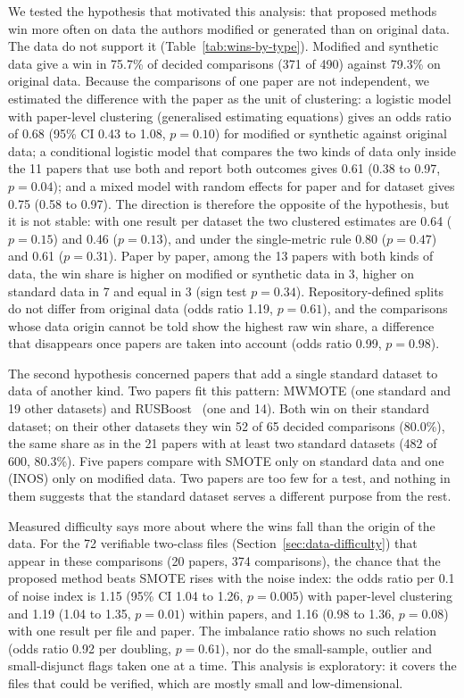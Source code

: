 We tested the hypothesis that motivated this analysis: that proposed methods win
more often on data the authors modified or generated than on original data. The data
do not support it (Table~\ref{tab:wins-by-type}). Modified and synthetic data give a
win in 75.7\% of decided comparisons (371 of 490) against 79.3\% on original data.
Because the comparisons of one paper are not independent, we estimated the
difference with the paper as the unit of clustering: a logistic model with
paper-level clustering (generalised estimating equations) gives an odds ratio of 0.68
(95\% CI 0.43 to 1.08, $p = 0.10$) for modified or synthetic against original data;
a conditional logistic model that compares the two kinds of data only inside the 11
papers that use both and report both outcomes gives 0.61 (0.38 to 0.97, $p = 0.04$);
and a mixed model with random effects for paper and for dataset gives 0.75 (0.58 to
0.97). The direction is therefore the opposite of the hypothesis, but it is not
stable: with one result per dataset the two clustered estimates are 0.64 ($p = 0.15$)
and 0.46 ($p = 0.13$), and under the single-metric rule 0.80 ($p = 0.47$) and 0.61
($p = 0.31$). Paper by paper, among the 13 papers with both kinds of data, the win
share is higher on modified or synthetic data in 3, higher on standard data in 7 and
equal in 3 (sign test $p = 0.34$). Repository-defined splits do not differ from
original data (odds ratio 1.19, $p = 0.61$), and the comparisons whose data origin
cannot be told show the highest raw win share, a difference that disappears once
papers are taken into account (odds ratio 0.99, $p = 0.98$).

The second hypothesis concerned papers that add a single standard dataset to data of
another kind. Two papers fit this pattern: MWMOTE (one standard and 19 other
datasets) and RUSBoost~ (one and 14). Both win on their
standard dataset; on their other datasets they win 52 of 65 decided comparisons
(80.0\%), the same share as in the 21 papers with at least two standard datasets
(482 of 600, 80.3\%). Five papers compare with SMOTE only on standard data and one
(INOS) only on modified data. Two papers are too few for a test, and nothing in them
suggests that the standard dataset serves a different purpose from the rest.

Measured difficulty says more about where the wins fall than the origin of the data.
For the 72 verifiable two-class files (Section~\ref{sec:data-difficulty}) that appear
in these comparisons (20 papers, 374 comparisons), the chance that the proposed method
beats SMOTE rises with the noise index: the odds ratio per 0.1 of noise index is 1.15
(95\% CI 1.04 to 1.26, $p = 0.005$) with paper-level clustering and 1.19 (1.04 to 1.35,
$p = 0.01$) within papers, and 1.16 (0.98 to 1.36, $p = 0.08$) with one result per file
and paper. The imbalance ratio shows no such relation (odds ratio 0.92 per doubling,
$p = 0.61$), nor do the small-sample, outlier and small-disjunct flags taken one at a
time. This analysis is exploratory: it covers the files that could be verified, which
are mostly small and low-dimensional.


